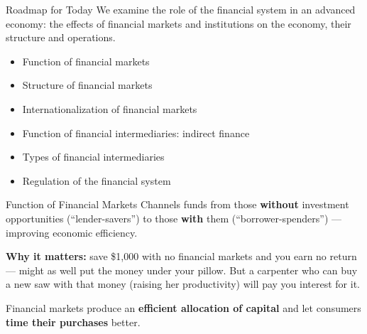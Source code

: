\documentclass[aspectratio=169]{beamer}
\begin{document}
\begin{frame}{Roadmap for Today}
We examine the role of the financial system in an advanced economy: the effects of financial markets and institutions on the economy, their structure and operations.
\vspace{0.5em}
\begin{itemize}
  \item Function of financial markets
  \item Structure of financial markets
  \item Internationalization of financial markets
  \item Function of financial intermediaries: indirect finance
  \item Types of financial intermediaries
  \item Regulation of the financial system
\end{itemize}
\end{frame}

\begin{frame}{Function of Financial Markets}
Channels funds from those \textbf{without} investment opportunities (``lender-savers'') to those \textbf{with} them (``borrower-spenders'') --- improving economic efficiency.
\vspace{0.6em}

\textbf{Why it matters:} save \$1,000 with no financial markets and you earn no return --- might as well put the money under your pillow. But a carpenter who can buy a new saw with that money (raising her productivity) will pay you interest for it.
\vspace{0.6em}

Financial markets produce an \textbf{efficient allocation of capital} and let consumers \textbf{time their purchases} better.
\end{frame}
\end{document}

